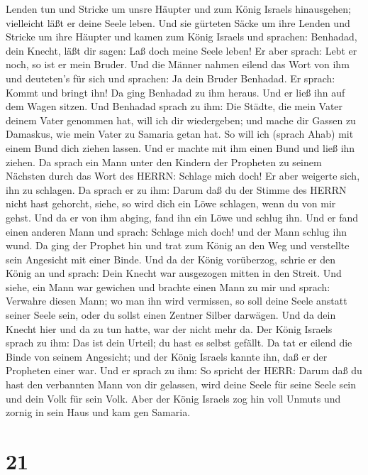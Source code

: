 Lenden tun und Stricke um unsre Häupter und zum König Israels
hinausgehen; vielleicht läßt er deine Seele leben.  Und sie
gürteten Säcke um ihre Lenden und Stricke um ihre Häupter und kamen zum
König Israels und sprachen: Benhadad, dein Knecht, läßt dir sagen: Laß
doch meine Seele leben! Er aber sprach: Lebt er noch, so ist er mein
Bruder.  Und die Männer nahmen eilend das Wort von ihm und
deuteten's für sich und sprachen: Ja dein Bruder Benhadad. Er sprach:
Kommt und bringt ihn! Da ging Benhadad zu ihm heraus. Und er ließ ihn
auf dem Wagen sitzen.  Und Benhadad sprach zu ihm: Die
Städte, die mein Vater deinem Vater genommen hat, will ich dir
wiedergeben; und mache dir Gassen zu Damaskus, wie mein Vater zu Samaria
getan hat. So will ich (sprach Ahab) mit einem Bund dich ziehen lassen.
Und er machte mit ihm einen Bund und ließ ihn ziehen.  Da
sprach ein Mann unter den Kindern der Propheten zu seinem Nächsten durch
das Wort des HERRN: Schlage mich doch! Er aber weigerte sich, ihn zu
schlagen.  Da sprach er zu ihm: Darum daß du der Stimme des
HERRN nicht hast gehorcht, siehe, so wird dich ein Löwe schlagen, wenn
du von mir gehst. Und da er von ihm abging, fand ihn ein Löwe und schlug
ihn.  Und er fand einen anderen Mann und sprach: Schlage
mich doch! und der Mann schlug ihn wund.  Da ging der
Prophet hin und trat zum König an den Weg und verstellte sein Angesicht
mit einer Binde.  Und da der König vorüberzog, schrie er
den König an und sprach: Dein Knecht war ausgezogen mitten in den
Streit. Und siehe, ein Mann war gewichen und brachte einen Mann zu mir
und sprach: Verwahre diesen Mann; wo man ihn wird vermissen, so soll
deine Seele anstatt seiner Seele sein, oder du sollst einen Zentner
Silber darwägen.  Und da dein Knecht hier und da zu tun
hatte, war der nicht mehr da. Der König Israels sprach zu ihm: Das ist
dein Urteil; du hast es selbst gefällt.  Da tat er eilend
die Binde von seinem Angesicht; und der König Israels kannte ihn, daß er
der Propheten einer war.  Und er sprach zu ihm: So spricht
der HERR: Darum daß du hast den verbannten Mann von dir gelassen, wird
deine Seele für seine Seele sein und dein Volk für sein Volk.
 Aber der König Israels zog hin voll Unmuts und zornig in
sein Haus und kam gen Samaria.

\hypertarget{section-20}{%
\section{21}\label{section-20}}


